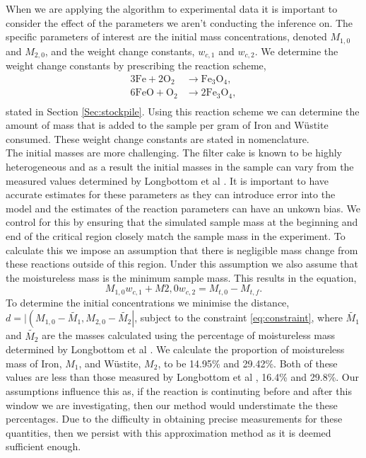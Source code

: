 When we are applying the algorithm to experimental data it is important to consider the effect of the parameters we aren't conducting the inference on. The specific parameters of interest are the initial mass concentrations, denoted $M_{1,0}$ and $M_{2,0}$, and the weight change constants, $w_{c,1}$ and $w_{c,2}$. We determine the weight change constants by prescribing the reaction scheme, 
\begin{align*}
3\text{Fe}+2\text{O}_2 &\rightarrow \text{Fe}_3\text{O}_4, \\
6\text{FeO}+\text{O}_2 &\rightarrow 2\text{Fe}_3\text{O}_4, \\
\end{align*}
stated in Section \ref{Sec:stockpile}. Using this reaction scheme we can determine the amount of mass that is added to the sample per gram of Iron and W\"ustite consumed. These weight change constants are stated in nomenclature.\\
The initial masses are more challenging. The filter cake is known to be highly heterogeneous and as a result the initial masses in the sample can vary from the measured values determined by Longbottom et al \cite{Ray19}. It is important to have accurate estimates for these parameters as they can introduce error into the model and the estimates of the reaction parameters can have an unkown bias. We control for this by ensuring that the simulated sample mass at the beginning and end of the critical region closely match the sample mass in the experiment. To calculate this we impose an assumption that there is negligible mass change from these reactions outside of this region. Under this assumption we also assume that the moistureless mass is the minimum sample mass. This results in the equation,
\begin{equation}
M_{1,0}w_{c,1}+M{2,0}w_{c,2}=M_{t,0}-M_{t,f}. \label{eq:constraint}
\end{equation} 
To determine the initial concentrations we minimise the distance, $d=\lvert \left(M_{1,0}-\tilde{M_1},M_{2,0}-\tilde{M_2}\right \rvert$, subject to the constraint \ref{eq:constraint}, where $ \tilde{M_1}$ and $\tilde{M_2}$ are the masses calculated using the percentage of moistureless mass determined by Longbottom et al \cite{Ray19}. We calculate the proportion of moistureless mass of Iron, $M_1$, and W\"ustite, $M_2$, to be 14.95\% and 29.42\%. Both of these values are less than those measured by Longbottom et al \cite{Ray19}, 16.4\% and 29.8\%. Our assumptions influence this as, if the reaction is continuting before and after this window we are investigating, then our method would understimate the these percentages. Due to the difficulty in obtaining precise measurements for these quantities, then we persist with this approximation method as it is deemed sufficient enough.\\

